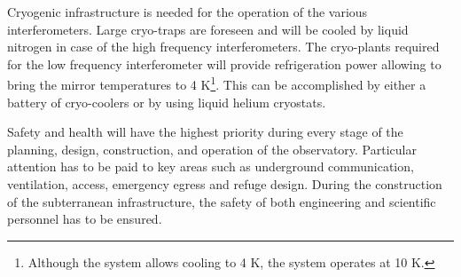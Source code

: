 Cryogenic infrastructure is needed for the operation of the various interferometers. Large cryo-traps are foreseen and will be cooled by liquid nitrogen in case of the high frequency interferometers. The cryo-plants required for the low frequency interferometer will provide refrigeration power allowing to bring the mirror temperatures to 4 K\footnote{Although the system allows cooling to 4 K, the system operates at 10 K.}. This can be accomplished by either a battery of cryo-coolers or by using liquid helium cryostats.

Safety and health will have the highest priority during every stage of the planning, design, construction, and operation of the observatory. Particular attention has to be paid to key areas such as underground communication, ventilation, access, emergency egress and refuge design. During the construction of the subterranean infrastructure, the safety of both engineering and scientific personnel has to be ensured. 

 